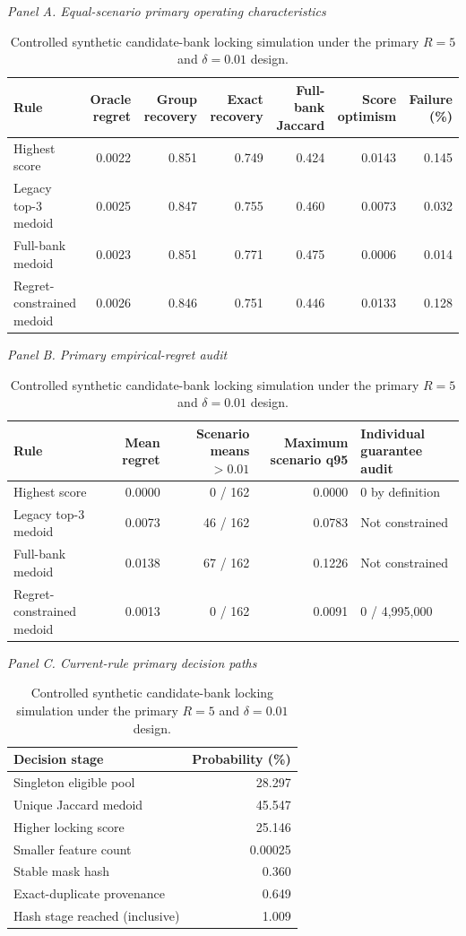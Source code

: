 \begin{table}[H]
\centering
\caption{Controlled synthetic candidate-bank locking simulation under the primary $R=5$ and $\delta=0.01$ design.}
\label{tab:supp22}
\scriptsize
\textit{Panel A. Equal-scenario primary operating characteristics}\par\smallskip
\setlength{\tabcolsep}{3.2pt}
\begin{tabular}{lrrrrrr}
\toprule
Rule & Oracle regret & Group recovery & Exact recovery & Full-bank Jaccard & Score optimism & Failure (\%) \\
\midrule
Highest score & 0.0022 & 0.851 & 0.749 & 0.424 & 0.0143 & 0.145 \\
Legacy top-3 medoid & 0.0025 & 0.847 & 0.755 & 0.460 & 0.0073 & 0.032 \\
Full-bank medoid & 0.0023 & 0.851 & 0.771 & 0.475 & 0.0006 & 0.014 \\
Regret-constrained medoid & 0.0026 & 0.846 & 0.751 & 0.446 & 0.0133 & 0.128 \\
\bottomrule
\end{tabular}

\medskip
\textit{Panel B. Primary empirical-regret audit}\par\smallskip
\setlength{\tabcolsep}{4.0pt}
\begin{tabular}{lrrrp{31mm}}
\toprule
Rule & Mean regret & Scenario means $>0.01$ & Maximum scenario q95 & Individual guarantee audit \\
\midrule
Highest score & 0.0000 & 0 / 162 & 0.0000 & 0 by definition \\
Legacy top-3 medoid & 0.0073 & 46 / 162 & 0.0783 & Not constrained \\
Full-bank medoid & 0.0138 & 67 / 162 & 0.1226 & Not constrained \\
Regret-constrained medoid & 0.0013 & 0 / 162 & 0.0091 & 0 / 4,995,000 \\
\bottomrule
\end{tabular}

\medskip
\textit{Panel C. Current-rule primary decision paths}\par\smallskip
\begin{tabular}{lr}
\toprule
Decision stage & Probability (\%) \\
\midrule
Singleton eligible pool & 28.297 \\
Unique Jaccard medoid & 45.547 \\
Higher locking score & 25.146 \\
Smaller feature count & 0.00025 \\
Stable mask hash & 0.360 \\
Exact-duplicate provenance & 0.649 \\
Hash stage reached (inclusive) & 1.009 \\
\bottomrule
\end{tabular}


\end{table}
